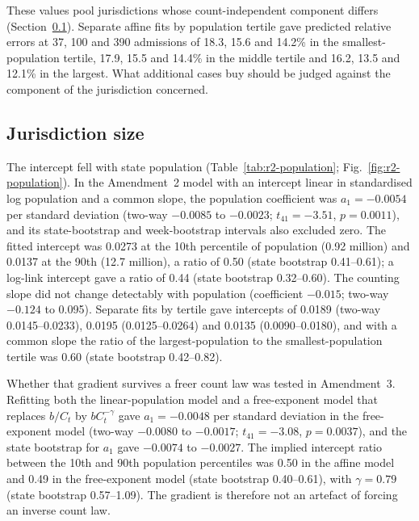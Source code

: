 These values pool jurisdictions whose count-independent component differs (Section~\ref{sec:res-pop}). Separate affine fits by population tertile gave predicted relative errors at 37, 100 and 390 admissions of 18.3, 15.6 and 14.2\% in the smallest-population tertile, 17.9, 15.5 and 14.4\% in the middle tertile and 16.2, 13.5 and 12.1\% in the largest. What additional cases buy should be judged against the component of the jurisdiction concerned.



\subsection{Jurisdiction size}
\label{sec:res-pop}

The intercept fell with state population (Table~\ref{tab:r2-population}; Fig.~\ref{fig:r2-population}). In the Amendment~2 model with an intercept linear in standardised log population and a common slope, the population coefficient was $a_1=-0.0054$ per standard deviation (two-way $-0.0085$ to $-0.0023$; $t_{41}=-3.51$, $p=0.0011$), and its state-bootstrap and week-bootstrap intervals also excluded zero. The fitted intercept was 0.0273 at the 10th percentile of population (0.92 million) and 0.0137 at the 90th (12.7 million), a ratio of 0.50 (state bootstrap 0.41--0.61); a log-link intercept gave a ratio of 0.44 (state bootstrap 0.32--0.60). The counting slope did not change detectably with population (coefficient $-0.015$; two-way $-0.124$ to 0.095). Separate fits by tertile gave intercepts of 0.0189 (two-way 0.0145--0.0233), 0.0195 (0.0125--0.0264) and 0.0135 (0.0090--0.0180), and with a common slope the ratio of the largest-population to the smallest-population tertile was 0.60 (state bootstrap 0.42--0.82).

Whether that gradient survives a freer count law was tested in Amendment~3. Refitting both the linear-population model and a free-exponent model that replaces $b/C_t$ by $bC_t^{-\gamma}$ gave $a_1=-0.0048$ per standard deviation in the free-exponent model (two-way $-0.0080$ to $-0.0017$; $t_{41}=-3.08$, $p=0.0037$), and the state bootstrap for $a_1$ gave $-0.0074$ to $-0.0027$. The implied intercept ratio between the 10th and 90th population percentiles was 0.50 in the affine model and 0.49 in the free-exponent model (state bootstrap 0.40--0.61), with $\gamma=0.79$ (state bootstrap 0.57--1.09). The gradient is therefore not an artefact of forcing an inverse count law.


